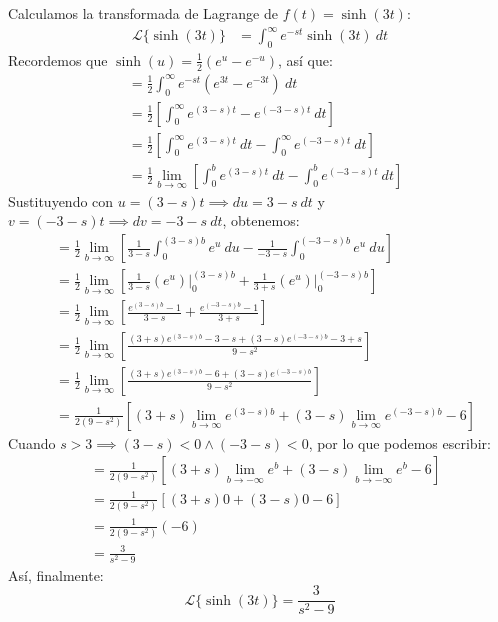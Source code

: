 \documentclass[12pt, a4paper]{article}
\begin{document}
Calculamos la transformada de Lagrange de \(f(t) = \sinh(3t)\):
\begin{align*}
	\mathcal{L}\{\sinh(3t)\} &= \int_{0}^{\infty} e^{-st} \sinh(3t) \ dt
\end{align*}
Recordemos que \(\sinh(u) = \frac{1}{2} (e^{u} - e^{-u})\), así que:
\begin{align*}
	&= \frac{1}{2} \int_{0}^{\infty} e^{-st} (e^{3t} - e^{-3t}) \ dt \\
	&= \frac{1}{2} \left[ \int_{0}^{\infty} e^{(3-s)t} - e^{(-3-s)t} \ dt \right] \\
	&= \frac{1}{2} \left[ \int_{0}^{\infty} e^{(3-s)t} \ dt - \int_{0}^{\infty} e^{(-3-s)t} \ dt \right] \\
	&= \frac{1}{2} \lim_{b \to \infty} \left[ \int_{0}^{b} e^{(3-s)t} \ dt - \int_{0}^{b} e^{(-3-s)t} \ dt \right]
\end{align*}
Sustituyendo con \(u = (3-s)t \implies du = 3-s\ dt\) y \(v = (-3-s)t \implies dv = -3-s\ dt\), obtenemos:
\begin{align*}
	&= \frac{1}{2} \lim_{b \to \infty} \left[ \frac{1}{3-s} \int_{0}^{(3-s)b} e^{u} \ du - \frac{1}{-3-s} \int_{0}^{(-3-s)b} e^{u} \ du \right] \\
	&= \frac{1}{2} \lim_{b \to \infty} \left[ \frac{1}{3-s} \left. \left( e^{u} \right) \right|_{0}^{(3-s)b} + \frac{1}{3+s} \left. \left( e^{u} \right) \right|_{0}^{(-3-s)b} \right] \\
	&= \frac{1}{2} \lim_{b \to \infty} \left[ \frac{e^{(3-s)b} - 1}{3-s} + \frac{e^{(-3-s)b} - 1}{3+s} \right] \\
	&= \frac{1}{2} \lim_{b \to \infty} \left[ \frac{(3+s) e^{(3-s)b} - 3 - s + (3-s)e^{(-3-s)b} - 3 + s}{9-s ^{2}} \right] \\
	&= \frac{1}{2} \lim_{b \to \infty} \left[ \frac{(3+s) e^{(3-s)b} - 6 + (3-s)e^{(-3-s)b}}{9-s ^{2}} \right] \\
	&= \frac{1}{2(9-s ^{2})} \left[ (3+s) \lim_{b \to \infty} e^{(3-s)b} + (3-s) \lim_{b \to \infty} e^{(-3-s)b} - 6 \right]
\end{align*}
Cuando \(s > 3 \implies (3-s) < 0 \land (-3-s) < 0\), por lo que podemos escribir:
\begin{align*}
	&= \frac{1}{2(9-s ^{2})} \left[ (3+s) \lim_{b \to -\infty} e^{b} + (3-s) \lim_{b \to -\infty} e^{b} - 6 \right] \\
	&= \frac{1}{2(9-s ^{2})} \left[ (3+s) 0 + (3-s) 0 - 6 \right] \\
	&= \frac{1}{2(9-s ^{2})} (-6) \\
	&= \frac{3}{s ^{2} - 9}
\end{align*}
Así, finalmente:
\[
	\mathcal{L}\{\sinh(3t)\} = \frac{3}{s ^{2} - 9}
\]
\end{document}
